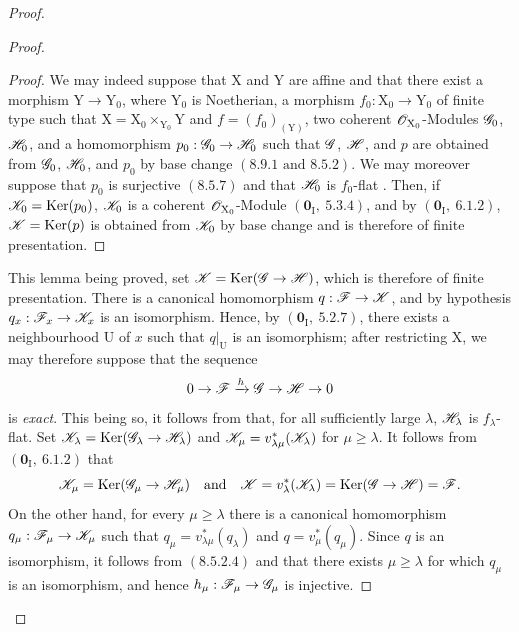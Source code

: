 \begin{proof}
\begin{proof}
\begin{proof}
We may indeed suppose that $\mathrm{X}$ and $\mathrm{Y}$ are affine and that there exist a morphism $\mathrm{Y}\to\mathrm{Y}_0$, where $\mathrm{Y}_0$ is Noetherian, a morphism $f_0:\mathrm{X}_0\to\mathrm{Y}_0$ of finite type such that $\mathrm{X}=\mathrm{X}_0\times_{\mathrm{Y}_0}\mathrm{Y}$ and $f=(f_0)_{(\mathrm{Y})}$, two coherent $\mathscr{O}_{\mathrm{X}_0}$-Modules $\mathscr{G}_0$, $\mathscr{H}_0$, and a homomorphism $p_0:\mathscr{G}_0\to\mathscr{H}_0$ such that $\mathscr{G}$, $\mathscr{H}$, and $p$ are obtained from $\mathscr{G}_0$, $\mathscr{H}_0$, and $p_0$ by base change $(8.9.1\text{ and }8.5.2)$. We may moreover suppose that $p_0$ is surjective $(8.5.7)$ and that $\mathscr{H}_0$ is $f_0$-flat . Then, if $\mathscr{K}_0=\operatorname{Ker}(p_0)$, $\mathscr{K}_0$ is a coherent $\mathscr{O}_{\mathrm{X}_0}$-Module $(\mathbf{0}_\mathrm{I},~5.3.4)$, and by $(\mathbf{0}_\mathrm{I},~6.1.2)$, $\mathscr{K}=\operatorname{Ker}(p)$ is obtained from $\mathscr{K}_0$ by base change and is therefore of finite presentation.
\end{proof}

This lemma being proved, set $\mathscr{K}=\operatorname{Ker}(\mathscr{G}\to\mathscr{H})$, which is therefore of finite presentation. There is a canonical homomorphism $q:\mathscr{F}\to\mathscr{K}$, and by hypothesis $q_x:\mathscr{F}_x\to\mathscr{K}_x$ is an isomorphism. Hence, by $(\mathbf{0}_\mathrm{I},~5.2.7)$, there exists a neighbourhood $\mathrm{U}$ of $x$ such that $q|_{\mathrm{U}}$ is an isomorphism; after restricting $\mathrm{X}$, we may therefore suppose that the sequence
\[
  0\to\mathscr{F}\xrightarrow{h}\mathscr{G}\to\mathscr{H}\to 0
\]
is \emph{exact}. This being so, it follows from  that, for all sufficiently large $\lambda$, $\mathscr{H}_\lambda$ is $f_\lambda$-flat. Set $\mathscr{K}_\lambda=\operatorname{Ker}(\mathscr{G}_\lambda\to\mathscr{H}_\lambda)$ and $\mathscr{K}_\mu=v^*_{\lambda\mu}(\mathscr{K}_\lambda)$ for $\mu\geqslant\lambda$. It follows from $(\mathbf{0}_\mathrm{I},~6.1.2)$ that
\[
  \mathscr{K}_\mu=\operatorname{Ker}(\mathscr{G}_\mu\to\mathscr{H}_\mu)
  \quad\text{and}\quad
  \mathscr{K}=v^*_\lambda(\mathscr{K}_\lambda)
  =\operatorname{Ker}(\mathscr{G}\to\mathscr{H})=\mathscr{F}.
\]
On the other hand, for every $\mu\geqslant\lambda$ there is a canonical homomorphism $q_\mu:\mathscr{F}_\mu\to\mathscr{K}_\mu$ such that $q_\mu=v^*_{\lambda\mu}(q_\lambda)$ and $q=v^*_\mu(q_\mu)$. Since $q$ is an isomorphism, it follows from $(8.5.2.4)$ and  that there exists $\mu\geqslant\lambda$ for which $q_\mu$ is an isomorphism, and hence $h_\mu:\mathscr{F}_\mu\to\mathscr{G}_\mu$ is injective.
\end{proof}


\end{proof}
